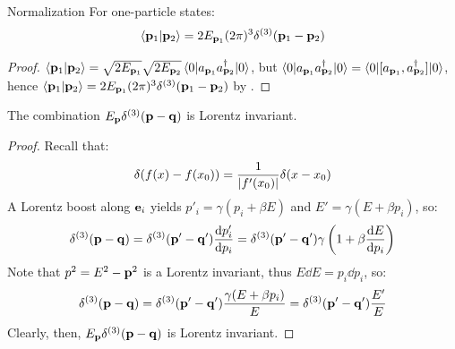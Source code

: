 \begin{proposition}{Normalization}{}
  For one-particle states:
  \begin{equation}
    \braket{\mathbf{p}_1 | \mathbf{p}_2} = 2E_{\mathbf{p}_1} (2\pi)^3 \delta^{(3)}(\mathbf{p}_1 - \mathbf{p}_2)
    \label{eq:scal-rel-norm}
  \end{equation}
\end{proposition}

\begin{proofbox}
  \begin{proof}
    $ \braket{\mathbf{p}_1 | \mathbf{p}_2} = \sqrt{2E_{\mathbf{p}_1}} \sqrt{2E_{\mathbf{p}_2}} \braket{0 | a_{\mathbf{p}_1} a_{\mathbf{p}_2}^\dagger | 0} $, but $ \braket{0 | a_{\mathbf{p}_1} a_{\mathbf{p}_2}^\dagger | 0} = \braket{0 | [a_{\mathbf{p}_1} , a_{\mathbf{p}_2}^\dagger] | 0} $, hence $ \braket{\mathbf{p}_1 | \mathbf{p}_2} = 2E_{\mathbf{p}_1} (2\pi)^3 \delta^{(3)}(\mathbf{p}_1 - \mathbf{p}_2) $ by .
  \end{proof}
\end{proofbox}

\begin{lemma}{}{}
  The combination $ E_{\mathbf{p}} \delta^{(3)}(\mathbf{p} - \mathbf{q}) $ is Lorentz invariant.
\end{lemma}

\begin{proofbox}
  \begin{proof}
    Recall that:
    \begin{equation}
      \delta(f(x) - f(x_0)) = \frac{1}{\left\lvert f'(x_0)\right\rvert} \delta(x - x_0)
    \end{equation}
    A Lorentz boost along $ \mathbf{e}_i $ yields $ p'_i = \gamma (p_i + \beta E) $ and $ E' = \gamma (E + \beta p_i) $, so:
    \begin{equation*}
        \delta^{(3)}(\mathbf{p} - \mathbf{q})
        = \delta^{(3)}(\mathbf{p}' - \mathbf{q}') \frac{\mathrm{d} p'_i}{\mathrm{d} p_i}
        = \delta^{(3)}(\mathbf{p}' - \mathbf{q}') \gamma \left( 1 + \beta \frac{\mathrm{d} E}{\mathrm{d} p_i} \right)
    \end{equation*}
    Note that $ p^2 = E^2 - \mathbf{p}^2 $ is a Lorentz invariant, thus $ E \dd E = p_i \dd p_i $, so:
    \begin{equation*}
      \delta^{(3)}(\mathbf{p} - \mathbf{q})
      = \delta^{(3)}(\mathbf{p}' - \mathbf{q}') \frac{\gamma (E + \beta p_i)}{E}
      = \delta^{(3)}(\mathbf{p}' - \mathbf{q}') \frac{E'}{E}
    \end{equation*}
    Clearly, then, $ E_{\mathbf{p}} \delta^{(3)}(\mathbf{p} - \mathbf{q}) $ is Lorentz invariant.
  \end{proof}
\end{proofbox}

